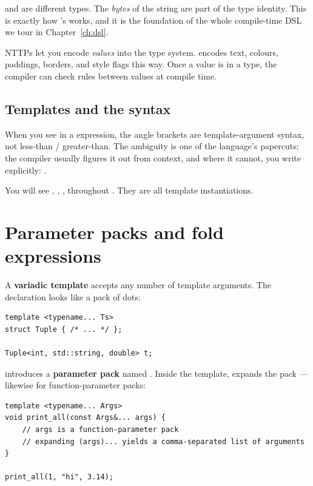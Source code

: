  and  are different types.
The \emph{bytes} of the string are part of the type identity. This
is exactly how \maya{}'s  works, and it is the
foundation of the whole compile-time DSL we tour in
Chapter~\ref{ch:dsl}.

\begin{idea}
NTTPs let you encode \emph{values} into the type system. \maya{}
encodes text, colours, paddings, borders, and style flags this way.
Once a value is in a type, the compiler can check rules between
values at compile time.
\end{idea}

\subsection{Templates and the \code{<>} syntax}

When you see  in a \cpp{} expression, the angle
brackets are template-argument syntax, not less-than / greater-than.
The ambiguity is one of the language's papercuts; the compiler
usually figures it out from context, and where it cannot, you write
 explicitly: .

You will see , , ,
 throughout \maya{}. They are all template
instantiations.

\section{Parameter packs and fold expressions}
\label{sec:cpp:packs}

A \textbf{variadic template} accepts any number of template arguments.
The declaration looks like a pack of dots:

\begin{lstlisting}
template <typename... Ts>
struct Tuple { /* ... */ };

Tuple<int, std::string, double> t;
\end{lstlisting}

 introduces a \textbf{parameter pack} named
. Inside the template,  expands the pack ---
likewise for function-parameter packs:

\begin{lstlisting}
template <typename... Args>
void print_all(const Args&... args) {
    // args is a function-parameter pack
    // expanding (args)... yields a comma-separated list of arguments
}

print_all(1, "hi", 3.14);
\end{lstlisting}

